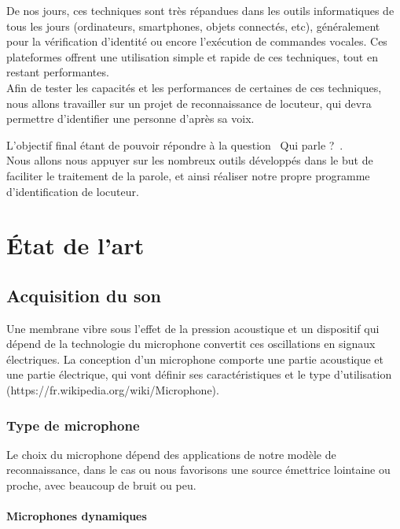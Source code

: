 \documentclass[a4paper, 12pt]{book}
\newcounter{program}[subsection]
\begin{document}
De nos jours, ces techniques sont très répandues dans les outils informatiques de tous les jours (ordinateurs, smartphones, objets connectés, etc), généralement pour la vérification d'identité ou encore l'exécution de commandes vocales. Ces plateformes offrent une utilisation simple et rapide de ces techniques, tout en restant performantes.\\

Afin de tester les capacités et les performances de certaines de ces techniques, nous allons travailler sur un projet de reconnaissance de locuteur, qui devra permettre d'identifier une personne d'après sa voix.

L'objectif final étant de pouvoir répondre à la question \guillemotleft{}~Qui parle ?~\guillemotright{}.\\

Nous allons nous appuyer sur les nombreux outils développés dans le but de faciliter le traitement de la parole, et ainsi réaliser notre propre programme d'identification de locuteur.


\chapter{État de l'art}

\section{Acquisition du son}

Une membrane vibre sous l'effet de la pression acoustique et un dispositif qui dépend de la technologie du microphone convertit ces oscillations en signaux électriques. La conception d'un microphone comporte une partie acoustique et une partie électrique, qui vont définir ses caractéristiques et le type d'utilisation (https://fr.wikipedia.org/wiki/Microphone).

\subsection{Type de microphone}

Le choix du microphone dépend des applications de notre modèle de reconnaissance, dans le cas ou nous favorisons une source émettrice lointaine ou proche, avec beaucoup de bruit ou peu. 


\subsubsection{Microphones dynamiques}
\end{document}
